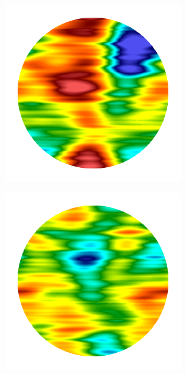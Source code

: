\begin{figure}[htb!]
\begin{subfigure}{0.14\textwidth}
    \caption{}
  \end{subfigure}
  \hspace{0.02\textwidth}
  \begin{subfigure}{0.15\textwidth}
    \includegraphics[width=\textwidth]{Chapter4/figures/2D/Gc_brick.png}
    \caption{}
  \end{subfigure}
  \begin{subfigure}{0.15\textwidth}
    \includegraphics[width=\textwidth]{Chapter4/figures/2D/psic_brick.png}

\end{subfigure}
\end{figure}
